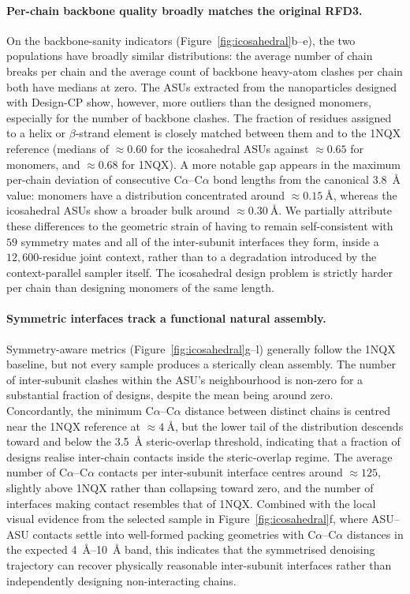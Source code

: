 \paragraph{Per-chain backbone quality broadly matches the original RFD3.}
On the backbone-sanity indicators (Figure~\ref{fig:icosahedral}b--e), the two
populations have broadly similar distributions: the average number of chain breaks
per chain and the average count of backbone heavy-atom clashes per chain both have
medians at zero. The ASUs extracted from the nanoparticles designed with Design-CP
show, however, more outliers than the designed monomers, especially for the number
of backbone clashes. The fraction of residues assigned to a helix or
$\beta$-strand element is closely matched between them and to the 1NQX reference
(medians of $\approx 0.60$ for the icosahedral ASUs against $\approx 0.65$ for
monomers, and $\approx 0.68$ for 1NQX). A more notable gap appears in the maximum
per-chain deviation of consecutive C$\alpha$--C$\alpha$ bond lengths from the
canonical \SI{3.8}{\angstrom} value: monomers have a distribution concentrated
around $\approx \SI{0.15}{\angstrom}$, whereas the icosahedral ASUs show a broader
bulk around $\approx \SI{0.30}{\angstrom}$. We partially attribute these
differences to the geometric strain of having to remain self-consistent with
$59$ symmetry mates and all of the inter-subunit interfaces they form, inside a
$12{,}600$-residue joint context, rather than to a degradation introduced by the
context-parallel sampler itself. The icosahedral design problem is strictly harder
per chain than designing monomers of the same length.

\paragraph{Symmetric interfaces track a functional natural assembly.}
Symmetry-aware metrics (Figure~\ref{fig:icosahedral}g--l) generally follow the
1NQX baseline, but not every sample produces a sterically clean assembly. The
number of inter-subunit clashes within the ASU's neighbourhood is non-zero for a
substantial fraction of designs, despite the mean being around zero.
Concordantly, the minimum C$\alpha$--C$\alpha$ distance between distinct chains is
centred near the 1NQX reference at $\approx \SI{4}{\angstrom}$, but the lower tail
of the distribution descends toward and below the \SI{3.5}{\angstrom}
steric-overlap threshold, indicating that a fraction of designs realise inter-chain
contacts inside the steric-overlap regime. The average number of
C$\alpha$--C$\alpha$ contacts per inter-subunit interface centres around
$\approx 125$, slightly above 1NQX rather than collapsing toward zero, and the
number of interfaces making contact resembles that of 1NQX. Combined with the
local visual evidence from the selected sample in
Figure~\ref{fig:icosahedral}f, where ASU--ASU contacts settle into well-formed
packing geometries with C$\alpha$--C$\alpha$ distances in the expected
\SIrange{4}{10}{\angstrom} band, this indicates that the symmetrised denoising
trajectory can recover physically reasonable inter-subunit interfaces rather than
independently designing non-interacting chains.

